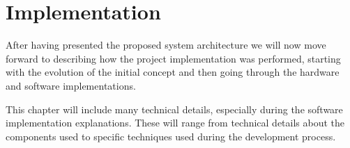 \chapter{Implementation} \label{chap:impl}

After having presented the proposed system architecture we will now move forward to describing how the project implementation was performed, starting with the evolution of the initial concept and then going through the hardware and software implementations.

This chapter will include many technical details, especially during the software implementation explanations.
These will range from technical details about the components used to specific techniques used during the development process.












